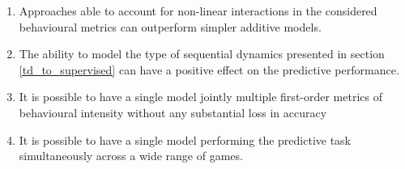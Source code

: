 \begin{enumerate}
    \item Approaches able to account for non-linear interactions in the considered behavioural metrics can outperform simpler additive models.
    \item The ability to model the type of sequential dynamics presented in section \ref{td_to_supervised} can have a positive effect on the predictive performance.
    \item It is possible to have a single model jointly multiple first-order metrics of behavioural intensity without any substantial loss in accuracy
    \item It is possible to have a single model performing the predictive task simultaneously across a wide range of games.
\end{enumerate}

